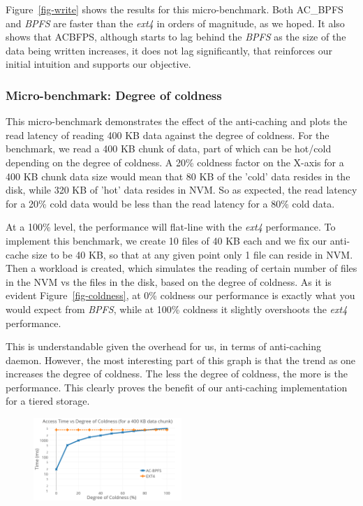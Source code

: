 Figure~\ref{fig-write} shows the results for this micro-benchmark. Both AC\_BPFS and \textit{BPFS} are faster than the  \textit{ext4}  in orders of magnitude, as we hoped. It also shows that AC\-BFPS, although starts to lag behind the \textit{BPFS} as the size of the data being written increases, it does not lag significantly, that reinforces our initial intuition and supports our objective.

\subsubsection{Micro-benchmark: Degree of coldness}
This micro-benchmark demonstrates the effect of the anti-caching and plots the read latency of reading 400 KB data against the degree of coldness. For the benchmark, we read a 400 KB chunk of data, part of which can be hot/cold depending on the degree of coldness. A 20\% coldness factor on the X-axis for a 400 KB chunk data size would mean that 80 KB of the 'cold' data resides in the disk, while 320 KB of 'hot' data resides in NVM. So as expected, the read latency for a 20\% cold data would be less than the read latency for a 80\% cold data.

At a 100\% level, the performance will flat-line with the  \textit{ext4}  performance. To implement this benchmark, we create 10 files of 40 KB each and we fix our anti-cache size to be 40 KB, so that at any given point only 1 file can reside in NVM. Then a workload is created, which simulates the reading of certain number of files in the NVM vs the files in the disk, based on the degree of coldness. As it is evident Figure~\ref{fig-coldness}, at 0\% coldness our performance is exactly what you would expect from \textit{BPFS}, while at 100\% coldness it slightly overshoots the  \textit{ext4}  performance.

This is understandable given the overhead for us, in terms of anti-caching daemon. However, the most interesting part of this graph is that the trend as one increases the degree of coldness. The less the degree of coldness, the more is the performance. This clearly proves the benefit of our anti-caching implementation for a tiered storage.

\begin{figure}
\centering
\vspace{-0.1in}
\includegraphics[width=0.5\textwidth]{figs/coldness.png}
\vspace{-0.1in}
\end{figure}

